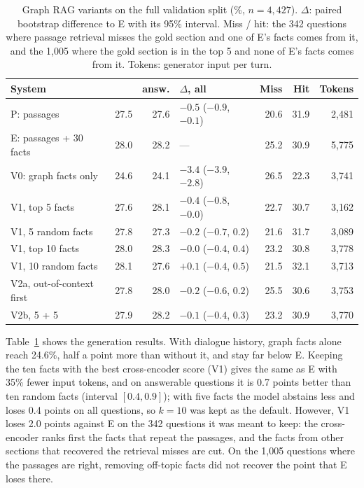 \begin{table}[ht]
    \centering
    \caption{Graph RAG variants on the full validation split (\%, $n = 4{,}427$). $\Delta$:
    paired bootstrap difference to E with its 95\% interval. Miss / hit: the 342 questions
    where passage retrieval misses the gold section and one of E's facts comes from it, and
    the 1{,}005 where the gold section is in the top 5 and none of E's facts comes from it.
    Tokens: generator input per turn.}
    \label{tab:graphrag:val}
    \small
    \begin{tabular}{lrrlrrr}
        \toprule
        System & \fone{} & answ. & $\Delta$\fone{}, all & Miss & Hit & Tokens \\
        \midrule
        P: passages                    & 27.5 & 27.6 & $-0.5$ ($-0.9$, $-0.1$) & 20.6 & 31.9 & 2{,}481 \\
        E: passages + 30 facts         & 28.0 & 28.2 & ---                     & 25.2 & 30.9 & 5{,}775 \\
        V0: graph facts only           & 24.6 & 24.1 & $-3.4$ ($-3.9$, $-2.8$) & 26.5 & 22.3 & 3{,}741 \\
        V1, top 5 facts                & 27.6 & 28.1 & $-0.4$ ($-0.8$, $-0.0$) & 22.7 & 30.7 & 3{,}162 \\
        V1, 5 random facts             & 27.8 & 27.3 & $-0.2$ ($-0.7$, $0.2$)  & 21.6 & 31.7 & 3{,}089 \\
        V1, top 10 facts               & 28.0 & 28.3 & $-0.0$ ($-0.4$, $0.4$)  & 23.2 & 30.8 & 3{,}778 \\
        V1, 10 random facts            & 28.1 & 27.6 & $+0.1$ ($-0.4$, $0.5$)  & 21.5 & 32.1 & 3{,}713 \\
        V2a, out-of-context first      & 27.8 & 28.0 & $-0.2$ ($-0.6$, $0.2$)  & 25.5 & 30.6 & 3{,}753 \\
        V2b, 5 + 5                     & 27.9 & 28.2 & $-0.1$ ($-0.4$, $0.3$)  & 23.2 & 30.9 & 3{,}770 \\
        \bottomrule
    \end{tabular}
\end{table}

Table~\ref{tab:graphrag:val} shows the generation results. With dialogue history, graph
facts alone reach 24.6\%, half a point more than without it, and stay far below E. Keeping
the ten facts with the best cross-encoder score (V1) gives the same \fone{} as E with 35\%
fewer input tokens, and on answerable questions it is 0.7 points better than ten random
facts (interval $[0.4, 0.9]$); with five facts the model abstains less and loses 0.4 points
on all questions, so $k = 10$ was kept as the default. However, V1 loses 2.0 points against
E on the 342 questions it was meant to keep: the cross-encoder ranks first the facts that
repeat the passages, and the facts from other sections that recovered the retrieval misses
are cut. On the 1{,}005 questions where the passages are right, removing off-topic facts did
not recover the point that E loses there.

